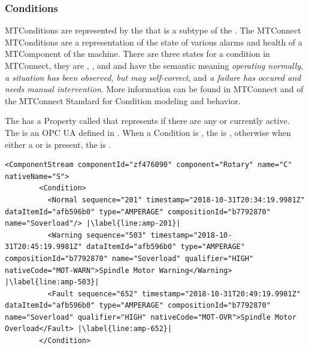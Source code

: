 \FloatBarrier

\subsubsection{Conditions}

\glspl{MTCondition} are represented by the  that is a subtype of the . The MTConnect \glspl{MTCondition} are a representation of the  state of various alarms and health of a \gls{MTComponent} of the machine. There are three states for a condition in MTConnect, they are , , and  and have the semantic meaning \textit{operating normally}, \textit{a situation has been observed, but may self-correct}, and \textit{a failure has occured and needs manual intervention}. More information can be found in MTConnect \cite{MTCPart2} and \cite{MTCPart3} of the MTConnect Standard for Condition modeling and behavior.

The  has a \gls{Property} called  that represents if there are any  or  currently active. The  is an OPC UA   defined in \cite{UAPart8}. When a Condition is , the  is , otherwise when either a  or  is present, the  is .

\begin{lstlisting}[firstnumber=last,escapechar=|,%
    caption={Rotary C Component Stream},label={lst:rotary-component-stream}]
      <ComponentStream componentId="zf476090" component="Rotary" name="C" nativeName="S">
        <Condition>
          <Normal sequence="201" timestamp="2018-10-31T20:34:19.9981Z" dataItemId="afb596b0" type="AMPERAGE" compositionId="b7792870" name="Soverload"/> |\label{line:amp-201}|
          <Warning sequence="503" timestamp="2018-10-31T20:45:19.9981Z" dataItemId="afb596b0" type="AMPERAGE" compositionId="b7792870" name="Soverload" qualifier="HIGH" nativeCode="MOT-WARN">Spindle Motor Warning</Warning> |\label{line:amp-503}|
          <Fault sequence="652" timestamp="2018-10-31T20:49:19.9981Z" dataItemId="afb596b0" type="AMPERAGE" compositionId="b7792870" name="Soverload" qualifier="HIGH" nativeCode="MOT-OVR">Spindle Motor Overload</Fault> |\label{line:amp-652}|
        </Condition>
\end{lstlisting}

